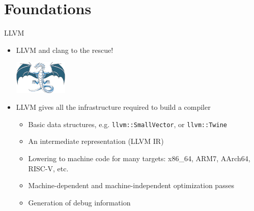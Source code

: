 \section{Foundations}

\begin{frame}{LLVM}
  \begin{itemize}
    \itemsep=1ex

  \item %
    LLVM and clang to the rescue!
    \begin{center}
      \includegraphics[width=1in]{img/LLVMWyvernSmall.png}
    \end{center}

  \item LLVM gives all the infrastructure required to build a compiler
    \begin{itemize}
    \item Basic data structures, e.g. \texttt{llvm::SmallVector}, or \texttt{llvm::Twine}
    \item An intermediate representation (LLVM IR)
    \item Lowering to machine code for many targets: x86\_64, ARM7, AArch64, RISC-V, etc.
    \item Machine-dependent and machine-independent optimization passes
    \item Generation of debug information
    \end{itemize}
  \end{itemize}


\end{frame}

